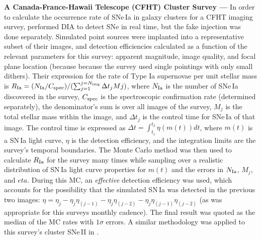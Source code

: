 \documentclass[DM,lsstdraft,toc]{lsstdoc}
\begin{document}
{\bf A Canada-France-Hawaii Telescope (CFHT) Cluster Survey ---} In order to calculate the occurrence rate of SNe\,Ia in galaxy clusters for a CFHT imaging survey, \cite{2012ApJ...746..163S} performed DIA to detect SNe in real time, but the fake injection was done separately. Simulated point sources were implanted into a representative subset of their images, and detection efficiencies calculated as a function of the relevant parameters for this survey: apparent magnitude, image quality, and focal plane location (because because the survey used single pointings with only small dithers). Their expression for the rate of Type Ia supernovae per unit stellar mass is $R_{\rm Ia} = (N_{\rm Ia} / C_{\rm spec}) / ( \sum_{j=1}^{j=N_{\rm img}} \Delta t_j Mj )$, where $N_{\rm Ia}$ is the number of SNe\,Ia discovered in the survey, $C_{\rm spec}$ is the spectroscopic confirmation rate (determined separately), the denominator's sum is over all images of the survey, $M_j$ is the total stellar mass within the image, and $\Delta t_j$ is the control time for SNe\,Ia of that image. The control time is expressed as $\Delta t = \int_{t_1}^{t_2} \eta(m(t)) dt$, where $m(t)$ is a SN\,Ia light curve, $\eta$ is the detection efficiency, and the integration limits are the survey's temporal boundaries. The Monte Carlo method was then used to calculate $R_{\rm Ia}$ for the survey many times while sampling over a realistic distribution of SN\,Ia light curve properties for $m(t)$ and the errors in $N_{\rm Ia}$, $M_j$, and $eta$. During this MC, an {\it effective} detection efficiency was used, which accounts for the possibility that the simulated SN\,Ia was detected in the previous two images: $\eta = \eta_j - \eta_j \eta_{(j-1)} - \eta_j \eta_{(j-2)} - \eta_j \eta_{(j-1)} \eta_{(j-2)}$ (as was appropriate for this surveys monthly cadence). The final result was quoted as the median of the MC rates with $1\sigma$ errors. A similar methodology was applied to this survey's cluster SNe\,II in \cite{2012ApJ...753...68G}.
\end{document}
